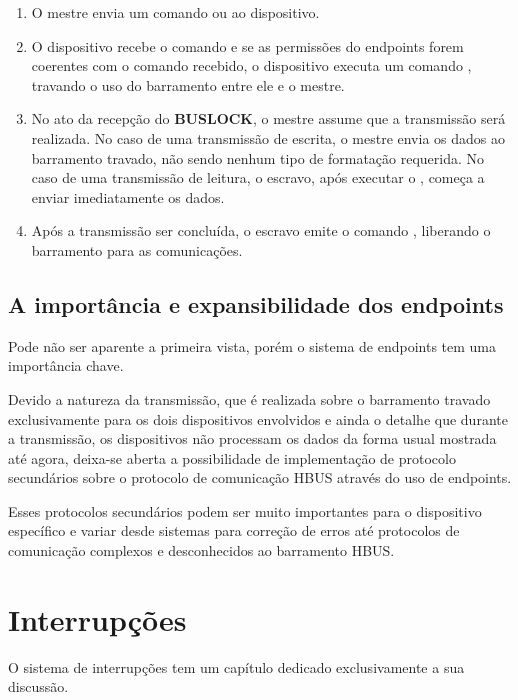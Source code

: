 \documentclass[11pt]{report}
\begin{document}
\begin{enumerate}

\item O mestre envia um comando  ou  ao dispositivo.
\item O dispositivo recebe o comando e se as permissões do endpoints forem coerentes com o comando recebido, o dispositivo executa um comando , travando o uso do barramento entre ele e o mestre.
\item No ato da recepção do \textbf{BUSLOCK}, o mestre assume que a transmissão será realizada. No caso de uma transmissão de escrita, o mestre envia os dados ao barramento travado, não sendo nenhum tipo de formatação requerida.
No caso de uma transmissão de leitura, o escravo, após executar o , começa a enviar imediatamente os dados.
\item Após a transmissão ser concluída, o escravo emite o comando , liberando o barramento para as comunicações.

\end{enumerate}

\subsection{A importância e expansibilidade dos endpoints}

Pode não ser aparente a primeira vista, porém o sistema de endpoints tem uma importância chave.

Devido a natureza da transmissão, que é realizada sobre o barramento travado exclusivamente para os dois dispositivos envolvidos e ainda o detalhe que durante a transmissão, os dispositivos não processam os dados da forma usual mostrada até agora, deixa-se aberta a possibilidade de implementação de protocolo secundários sobre o protocolo de comunicação HBUS através do uso de endpoints.

Esses protocolos secundários podem ser muito importantes para o dispositivo específico e variar desde sistemas para correção de erros até protocolos de comunicação complexos e desconhecidos ao barramento HBUS.

\section{Interrupções}

O sistema de interrupções tem um capítulo dedicado exclusivamente a sua discussão.
\end{document}
